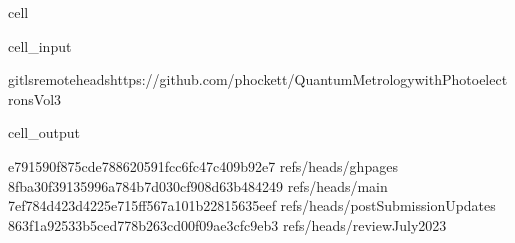 \documentclass[letterpaper,table,10pt,english]{jupyterBook}
\begin{document}
\begin{sphinxuseclass}{cell}\begin{sphinxVerbatimInput}

\begin{sphinxuseclass}{cell_input}
\begin{sphinxVerbatim}[commandchars=\\\{\}]
gitls\PYGZhy{}remote\PYGZhy{}\PYGZhy{}headshttps://github.com/phockett/Quantum\PYGZhy{}Metrology\PYGZhy{}with\PYGZhy{}Photoelectrons\PYGZhy{}Vol3
\end{sphinxVerbatim}

\end{sphinxuseclass}\end{sphinxVerbatimInput}
\begin{sphinxVerbatimOutput}

\begin{sphinxuseclass}{cell_output}
\begin{sphinxVerbatim}[commandchars=\\\{\}]
e791590f875cde788620591fcc6fc47c409b92e7	refs/heads/gh\PYGZhy{}pages
8fba30f39135996a784b7d030cf908d63b484249	refs/heads/main
7ef784d423d4225e715ff567a101b22815635eef	refs/heads/postSubmissionUpdates
863f1a92533b5ced778b263cd00f09ae3cfc9eb3	refs/heads/reviewJuly2023
\end{sphinxVerbatim}

\end{sphinxuseclass}\end{sphinxVerbatimOutput}

\end{sphinxuseclass}
\end{document}
